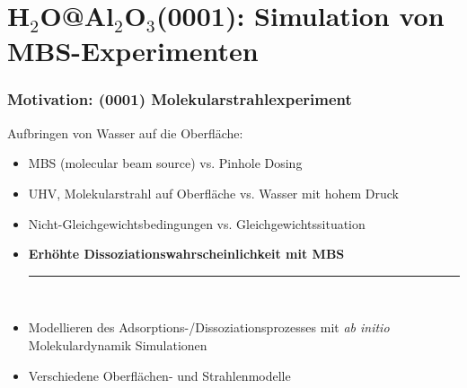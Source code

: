 \documentclass[hyperref={pdfpagelabels=false}]{beamer}
\begin{document}
\section{H$_2$O@Al$_2$O$_3$(0001): Simulation von MBS-Experimenten~~~~~~~~~~}
\begin{frame}
 \frametitle{Motivation: (0001) Molekularstrahlexperiment}
Aufbringen von Wasser auf die Oberfläche: 
 \begin{itemize}
 \item MBS (molecular beam source) vs. Pinhole Dosing
 \item UHV, Molekularstrahl auf Oberfläche vs. Wasser mit hohem Druck
 \item Nicht-Gleichgewichtsbedingungen vs. Gleichgewichtssituation
 \item \textbf{Erhöhte Dissoziationswahrscheinlichkeit mit MBS}
 \newline~
 \pause \hrule
 \newline~
 \item Modellieren des Adsorptions-/Dissoziationsprozesses mit \textit{ab initio} Molekulardynamik Simulationen
 \item Verschiedene Oberflächen- und Strahlenmodelle
\end{itemize}
\pause
\newline~\newline~
\end{frame}
\end{document}
